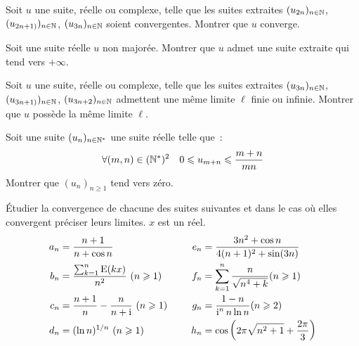 \begin{exercice}
    Soit \(u\) une suite, réelle ou complexe, telle que les suites extraites \((u_{2n})_{n \in \mathbb{N}}\), \((u_{2n+1)})_{n \in \mathbb{N}}\), \((u_{3n})_{n \in \mathbb{N}}\) soient convergentes. Montrer que \(u\) converge.
\end{exercice}
\begin{exercice}
    Soit une suite réelle \(u\) non majorée. Montrer que \(u\) admet une suite extraite qui tend vers \(+\infty\).
\end{exercice}
\begin{exercice}
    Soit \(u\) une suite, réelle ou complexe, telle que les suites extraites \((u_{3n})_{n \in \mathbb{N}}\), \((u_{3n+1)})_{n \in \mathbb{N}}\), \((u_{3n+2})_{n \in \mathbb{N}}\) admettent une même limite \(\ell\) finie ou infinie. Montrer que \(u\) possède la même limite \(\ell\).
\end{exercice}
\begin{exercice}
    Soit une suite \((u_n)_{n \in \mathbb{N}^*}\) une suite réelle telle que~:
    \[\forall (m,n) \in (\mathbb{N}^*)^2 \quad 0 \leqslant u_{m+n} \leqslant \frac{m+n}{mn}\]
    Montrer que \((u_n)_{n\geqslant 1}\) tend vers zéro.
\end{exercice}
\begin{exercice}
    Étudier la convergence de chacune des suites suivantes et dans le cas où elles convergent préciser leurs limites. \(x\) est un réel.
    \begin{align*}
        a_n &= \frac{n+1}{n+\cos n} \qquad & e_n &=\frac{3n^2+\cos n}{4(n+1)^2+\sin(3n)} \\
        b_n &= \frac{\sum_{k=1}^n \operatorname{E}(kx)}{n^2} \ (n \geqslant 1) \qquad & f_n &= \sum_{k=1}^n \frac{n}{\sqrt{n^4+k}} (n \geqslant 1) \\
        c_n &= \frac{n+1}{n} - \frac{n}{n+\operatorname{i}} \ (n \geqslant 1) \quad & g_n &= \frac{1-n}{\operatorname{i}^n n \ln n} (n\geqslant 2) \\
        d_n &= (\ln n)^{1/n} \ (n \geqslant 1) \quad & h_n &= \cos\left(2\pi\sqrt{n^2+1}+\frac{2\pi}{3}\right)
    \end{align*}
\end{exercice}

